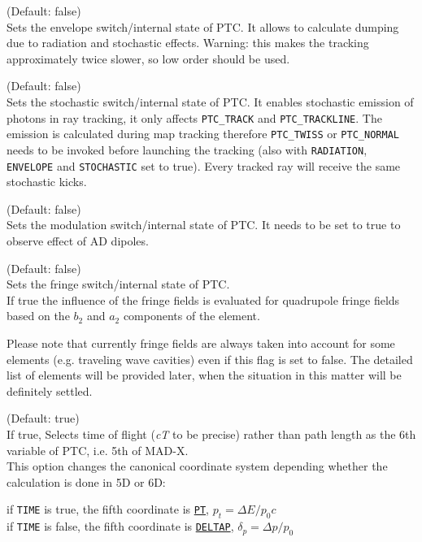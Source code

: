 \begin{madlist}
	 (Default: false)\\
	Sets the envelope switch/internal state of PTC. It allows to calculate
	dumping due to radiation and stochastic effects.
	Warning: this makes the tracking approximately twice slower, so low order
	should be used.

	 (Default: false)\\
	Sets the stochastic switch/internal state of PTC.
	It enables stochastic emission of photons in ray tracking,
                    it only affects \texttt{PTC\_TRACK} and \texttt{PTC\_TRACKLINE}.
	The emission is calculated during map tracking therefore
	\texttt{PTC\_TWISS} or \texttt{PTC\_NORMAL}
	needs to be invoked before launching the tracking
	(also with \texttt{RADIATION}, \texttt{ENVELOPE} and \texttt{STOCHASTIC} set to true).
	Every tracked ray will receive the same stochastic kicks.

	 (Default: false)\\
	Sets the modulation switch/internal state of PTC.
	It needs to be set to true to observe effect of AD dipoles.

	 (Default: false)\\
	Sets the fringe switch/internal state of PTC. \\
	If true the influence of the fringe fields is evaluated for quadrupole fringe fields based on the $b_2$ and $a_2$ components of the element.

	Please note that currently fringe fields are always taken into
	account for some elements (e.g. traveling wave cavities) even if
	this flag is set to false. The detailed list of elements
	will be provided later, when the situation in this matter will be
	definitely settled.

	 (Default: true)\\
	If true, Selects time of flight (\textit{cT} to be precise) rather
	than path length as the 6th variable of PTC, i.e. 5th of MAD-X. \\
                    This option changes the canonical coordinate system depending
	whether the calculation is done in 5D or 6D:
	 \begin{madlist}
	    if \texttt{TIME} is true, the fifth coordinate is
	   \hyperref[subsec:tables-canon]{\texttt{PT}},
	   $p_t = \Delta E / p_0 c$ \\
	   if \texttt{TIME} is false, the fifth coordinate is
	   \hyperref[subsec:tables-canon]{\texttt{DELTAP}},
	   $\delta_p = \Delta p / p_0$


\end{madlist}
\end{madlist}
